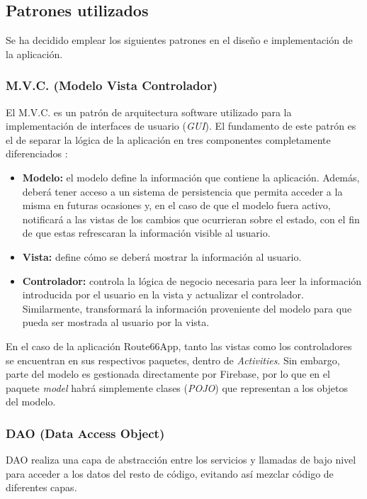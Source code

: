 \documentclass[twoside]{report}
\begin{document}
\subsection{Patrones utilizados}
Se ha decidido emplear los siguientes patrones en el diseño e implementación de la aplicación.

\subsubsection{M.V.C. (Modelo Vista Controlador)}
El M.V.C. es un patrón de arquitectura software utilizado para la implementación de interfaces de usuario (\textit{GUI}). El fundamento de este patrón es el de separar la lógica de la aplicación en tres componentes completamente diferenciados \cite{mvcua}:
\begin{itemize}
\item \textbf{Modelo:} el modelo define la información que contiene la aplicación. Además, deberá tener acceso a un sistema de persistencia que permita acceder a la misma en futuras ocasiones y, en el caso de que el modelo fuera activo, notificará a las vistas de los cambios que ocurrieran sobre el estado, con el fin de que estas refrescaran la información visible al usuario.
\item \textbf{Vista:} define cómo se deberá mostrar la información al usuario.
\item \textbf{Controlador:} controla la lógica de negocio necesaria para leer la información introducida por el usuario en la vista y actualizar el controlador. Similarmente, transformará la información proveniente del modelo para que pueda ser mostrada al usuario por la vista.
\end{itemize}
En el caso de la aplicación Route66App, tanto las vistas como los controladores se encuentran en sus respectivos paquetes, dentro de \textit{Activities}. Sin embargo, parte del modelo es gestionada directamente por Firebase, por lo que en el paquete \textit{model} habrá simplemente clases (\textit{POJO}) que representan a los objetos del modelo.

\subsubsection{DAO (Data Access Object)}

DAO realiza una capa de abstracción entre los servicios y llamadas de bajo nivel para acceder a los datos del resto de código, evitando así mezclar código de diferentes capas.
\end{document}
